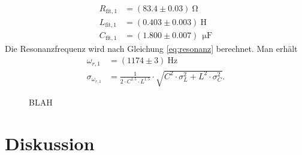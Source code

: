 \documentclass[12pt,a4paper,titlepage,headinclude]{scrartcl}
\numberwithin{equation}{section}
\newcommand{\mrm}[1]{\mathrm{#1}}
\begin{document}
\begin{align}
	R_{\mrm{fit},1}&=(83.4\pm0.03)~\mrm{\Omega}
	\label{eq:Rfit1}\\
	L_{\mrm{fit},1}&=(0.403\pm0.003)~\mrm{H}
	\label{eq:Lfit1}\\
	C_{\mrm{fit},1}&=(1.800\pm0.007)~\SI{}{\micro\farad}
	\label{eq:Cfit1}
\end{align}
Die Resonanzfrequenz wird nach Gleichung \eqref{eq:resonanz} berechnet. Man erhält
\begin{align}
	\omega_{r,1}&=(1174 \pm 3)~\mrm{Hz}\label{eq:resonanzfrequenz1}\\
	\sigma_{\omega_{r,1}}&=\frac{1}{2\cdot C^{1.5} \cdot L^{1.5}} \cdot \sqrt{C^{2} \cdot \sigma_{L}^{2} + L^{2} \cdot \sigma_{C}^{2}}.
	\label{eq:sigmaresonanzfrequenz1}
\end{align}
\begin{figure}[h!]
	\centering
	
	\caption{BLAH}
	\label{fig:zeiger2}
\end{figure}


\section{Diskussion}
\label{sec:diskussion}

\newpage
\printbibliography[heading=bibintoc]
\end{document}
